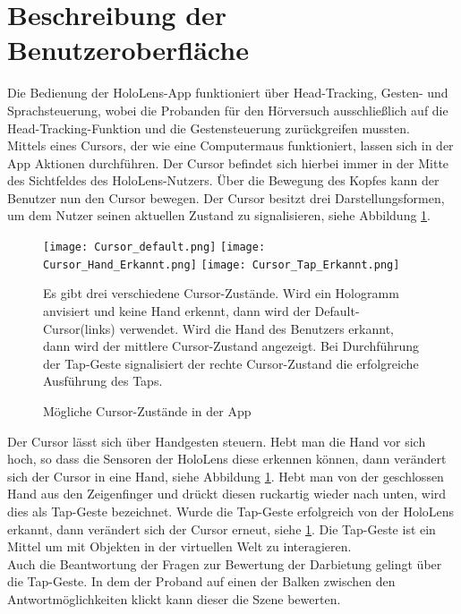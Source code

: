  \newpage
 \section{Beschreibung der Benutzeroberfläche}
 Die Bedienung der HoloLens-App funktioniert über Head-Tracking, Gesten- und Sprachsteuerung, wobei die Probanden für den Hörversuch ausschließlich auf die Head-Tracking-Funktion und die Gestensteuerung zurückgreifen mussten. \\
 
 Mittels eines Cursors, der wie eine Computermaus funktioniert, lassen sich in der App Aktionen durchführen. Der Cursor befindet sich hierbei immer in der Mitte des Sichtfeldes des HoloLens-Nutzers. Über die Bewegung des Kopfes kann der Benutzer nun den Cursor bewegen. Der Cursor besitzt drei Darstellungsformen, um dem Nutzer seinen aktuellen Zustand zu signalisieren, siehe Abbildung \ref{fig:Cursor}. 
 
  \begin{figure}[H]
\centering
\texttt{[image: Cursor\_default.png]}
\texttt{[image: Cursor\_Hand\_Erkannt.png]}
\texttt{[image: Cursor\_Tap\_Erkannt.png]}
\caption{Mögliche Cursor-Zustände in der App}
Es gibt drei verschiedene Cursor-Zustände. Wird ein Hologramm anvisiert und keine Hand erkennt, dann wird der Default-Cursor(links) verwendet. Wird die Hand des Benutzers erkannt, dann wird der mittlere Cursor-Zustand angezeigt. Bei Durchführung der Tap-Geste signalisiert der rechte Cursor-Zustand die erfolgreiche Ausführung des Taps. 
\label{fig:Cursor}
\end{figure} 
 
  \vspace*{20pt}
 Der Cursor lässt sich über Handgesten steuern. Hebt man die Hand vor sich hoch, so dass die Sensoren der HoloLens diese erkennen können, dann verändert sich der Cursor in eine Hand, siehe Abbildung \ref{fig:Cursor}. Hebt man von der geschlossen Hand aus den Zeigenfinger und drückt diesen ruckartig wieder nach unten, wird dies als Tap-Geste bezeichnet. Wurde die Tap-Geste erfolgreich von der HoloLens erkannt, dann verändert sich der Cursor erneut, siehe \ref{fig:Cursor}. Die Tap-Geste ist ein Mittel um mit Objekten in der virtuellen Welt zu interagieren. \\
 
 Auch die Beantwortung der Fragen zur Bewertung der Darbietung gelingt über die Tap-Geste. In dem der Proband auf einen der Balken zwischen den Antwortmöglichkeiten klickt kann dieser die Szene bewerten.
 
